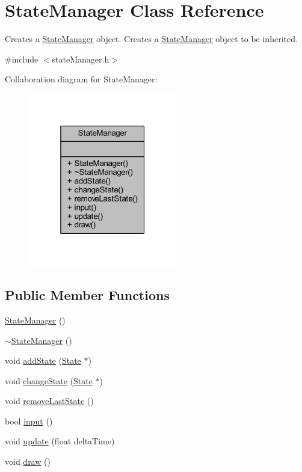 \hypertarget{class_state_manager}{\section{State\+Manager Class Reference}
\label{class_state_manager}
}


Creates a \hyperlink{class_state_manager}{State\+Manager} object. Creates a \hyperlink{class_state_manager}{State\+Manager} object to be inherited.  




{\ttfamily \#include $<$state\+Manager.\+h$>$}



Collaboration diagram for State\+Manager\+:\nopagebreak
\begin{figure}[H]
\begin{center}
\leavevmode
\includegraphics[width=184pt]{class_state_manager__coll__graph}
\end{center}
\end{figure}
\subsection*{Public Member Functions}
\begin{DoxyCompactItemize}
\item 
\hyperlink{class_state_manager_a3e2be96d935eb56813b096a885d58587}{State\+Manager} ()
\item 
\hyperlink{class_state_manager_a05a43504a033f1befad5c5118249ec6f}{$\sim$\+State\+Manager} ()
\item 
void \hyperlink{class_state_manager_a6bc633ce02f7884f082fb4ca1a53639b}{add\+State} (\hyperlink{class_state}{State} $\ast$)
\item 
void \hyperlink{class_state_manager_abad20819be992649c733f45b2a7164e2}{change\+State} (\hyperlink{class_state}{State} $\ast$)
\item 
void \hyperlink{class_state_manager_a9b20b650cab8e9068387ac12b7e60f28}{remove\+Last\+State} ()
\item 
bool \hyperlink{class_state_manager_afa8f2a280c332673075bfdd254a95603}{input} ()
\item 
void \hyperlink{class_state_manager_ae02fb746e1ef597d2842aaec506030b2}{update} (float delta\+Time)
\item 
void \hyperlink{class_state_manager_a22666f2f72320ea3be46e9253b7530e2}{draw} ()
\end{DoxyCompactItemize}


